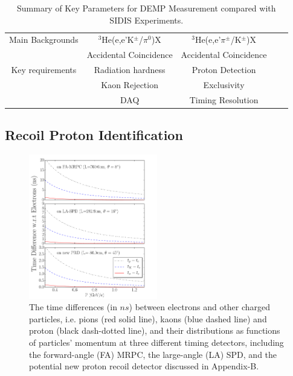 \begin{table}
\begin{tabular}{|c|c|c|c|c|}
Main Backgrounds           & $\mathrm{^{3}He}$(e,e'K$^\pm$/$\pi^{0}$)X            &$\mathrm{^{3}He}$(e,e'$\pi^{\pm}$/K$^\pm$)X  \\
                           &   Accidental Coincidence & Accidental Coincidence	\\\hline
Key requirements           &  Radiation hardness      & Proton Detection	\\
                           &  Kaon Rejection          & Exclusivity	\\
                           &  DAQ                     &    Timing Resolution   \\
                        \hline
\end{tabular}
\caption{\footnotesize{Summary of Key Parameters for DEMP Measurement compared
    with SIDIS Experiments.}}\label{table:program_summary}
\label{table:key_par_sidis_dvcs}
\end{table} 

\subsection{Recoil Proton Identification}

\begin{figure}[!ht]
 \begin{center}
  \includegraphics[width=0.5\textwidth]{./figures/time_diff.pdf}
   \caption[Time-of-time]{\footnotesize{The time differences (in $ns$) between
       electrons and other charged particles, i.e. pions (red solid line),
       kaons (blue dashed line) and proton (black dash-dotted line), and their
       distributions as functions of particles' momentum at three different
       timing detectors, including the forward-angle (FA) MRPC, the large-angle
       (LA) SPD, and the potential new proton recoil detector discussed in
       Appendix-B.}}
   \label{tof_diff}
 \end{center}
\end{figure}

